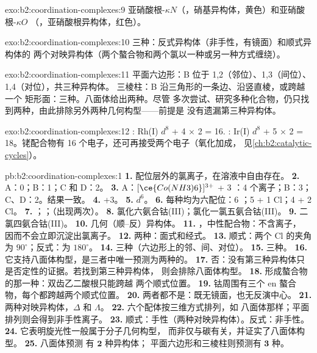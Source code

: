\begin{solution}{exo:b2:coordination-complexes:9}
亚硝酸根-$\kappa N$（，硝基异构体，黄色）和亚硝酸根-$\kappa O$
（，亚硝酸根异构体，红色）。
\end{solution}

\begin{solution}{exo:b2:coordination-complexes:10}
三种：反式异构体（非手性，有镜面）和顺式异构体的
两个对映异构体（两个螯合物和两个氯以一种或另一种方式缠绕）。
\end{solution}

\begin{solution}{exo:b2:coordination-complexes:11}
平面六边形：B 位于 1,2（邻位）、1,3（间位）、1,4（对位），共三种异构体。
三棱柱：B 沿三角形的一条边、沿竖直棱，或跨越一个
矩形面：三种。八面体给出两种。尽管
多次尝试、研究多种化合物，仍只找到两种，由此排除另外两种几何构型——前提是
没有遗漏第三种异构体。
\end{solution}

\begin{solution}{exo:b2:coordination-complexes:12}
: Rh(I) $d^8$ + 4 × 2 = 16. : Ir(I) $d^8$ + 5 × 2 =
18。铑配合物有 16 个电子，还可再接受两个电子（氧化加成，
见\cref{ch:b2:catalytic-cycles}）。
\end{solution}

\begin{solution}{pb:b2:coordination-complexes:1}
\textbf{1.} 配位层外的氯离子，在溶液中自由存在。
\textbf{2.} A：0；B：1；C 和 D：2。
\textbf{3.} A：$[\ce{Co(NH3)6}]^{3+}$ + 3 ：4 个离子；B：3；C、D：2。结果一致。
\textbf{4.} +3。
\textbf{5.} $d^6$。
\textbf{6.} 每种均为六配位：6 ；5  + 1 Cl；4  + 2 Cl。
\textbf{7.} ；；（出现两次）。
\textbf{8.} 氯化六氨合钴(III)；氯化一氯五氨合钴(III)。
\textbf{9.} 二氯四氨合钴(III)。
\textbf{10.} 几何（顺–反）异构体。
\textbf{11.} \ce{[CoCl3(NH3)3]}，中性配合物：不含离子，
因而不会立即沉淀出氯离子。
\textbf{12.} 两种：面式和经式。
\textbf{13.} 顺式：两个 Cl 的夹角为 $90^\circ$；反式：为 $180^\circ$。
\textbf{14.} 三种（六边形上的邻、间、对位）。
\textbf{15.} 三种。
\textbf{16.} 它支持八面体构型，是三者中唯一预测为两种的。
\textbf{17.} 否：没有第三种异构体只是否定性的证据。若找到第三种异构体，
则会排除八面体构型。
\textbf{18.} 形成螯合物的那一种：双齿乙二酸根只能跨越
两个顺式位置。
\textbf{19.} 钴周围有三个 en 螯合物，每个都跨越两个顺式位置。
\textbf{20.} 两者都不是：既无镜面，也无反演中心。
\textbf{21.} 两种对映异构体，$\Delta$ 和 $\Lambda$。
\textbf{22.} 六个配体按三维方式排列，如
八面体那样；平面排列则会得到非手性离子。
\textbf{23.} 顺式：手性（两种对映异构体）。反式：非手性。
\textbf{24.} 它表明旋光性一般属于分子几何构型，
而非仅与碳有关，并证实了八面体构型。
\textbf{25.} 八面体预测 \ce{[CoCl2(NH3)4]+} 有 $\boldsymbol{2}$ 种异构体；
平面六边形和三棱柱则预测有 $\boldsymbol{3}$ 种。
\end{solution}
